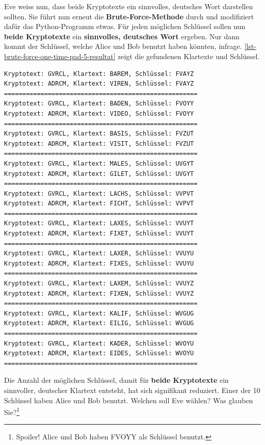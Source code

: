 Eve weiss nun, dass beide Kryptotexte ein sinnvolles, deutsches Wort darstellen sollten. Sie führt nun erneut die \textbf{Brute-Force-Methode} durch und modifiziert dafür das Python-Programm etwas. Für jeden möglichen Schlüssel sollen nun \textbf{beide Kryptotexte} ein \textbf{sinnvolles, deutsches Wort} ergeben. Nur dann kommt der Schlüssel, welche Alice und Bob benutzt haben könnten, infrage. \autoref{lst-brute-force-one-time-pad-5-resultat} zeigt die gefundenen Klartexte und Schlüssel.

\begin{lstlisting}[language=output, label={lst-brute-force-one-time-pad-5-resultat}, caption={Es wurden \num{10} mögliche sinnvolle Klartexte für die beiden Kryptotexte gefunden.}]
Kryptotext: GVRCL, Klartext: BAREM, Schlüssel: FVAYZ
Kryptotext: ADRCM, Klartext: VIREN, Schlüssel: FVAYZ
=====================================================
Kryptotext: GVRCL, Klartext: BADEN, Schlüssel: FVOYY
Kryptotext: ADRCM, Klartext: VIDEO, Schlüssel: FVOYY
=====================================================
Kryptotext: GVRCL, Klartext: BASIS, Schlüssel: FVZUT
Kryptotext: ADRCM, Klartext: VISIT, Schlüssel: FVZUT
=====================================================
Kryptotext: GVRCL, Klartext: MALES, Schlüssel: UVGYT
Kryptotext: ADRCM, Klartext: GILET, Schlüssel: UVGYT
=====================================================
Kryptotext: GVRCL, Klartext: LACHS, Schlüssel: VVPVT
Kryptotext: ADRCM, Klartext: FICHT, Schlüssel: VVPVT
=====================================================
Kryptotext: GVRCL, Klartext: LAXES, Schlüssel: VVUYT
Kryptotext: ADRCM, Klartext: FIXET, Schlüssel: VVUYT
=====================================================
Kryptotext: GVRCL, Klartext: LAXER, Schlüssel: VVUYU
Kryptotext: ADRCM, Klartext: FIXES, Schlüssel: VVUYU
=====================================================
Kryptotext: GVRCL, Klartext: LAXEM, Schlüssel: VVUYZ
Kryptotext: ADRCM, Klartext: FIXEN, Schlüssel: VVUYZ
=====================================================
Kryptotext: GVRCL, Klartext: KALIF, Schlüssel: WVGUG
Kryptotext: ADRCM, Klartext: EILIG, Schlüssel: WVGUG
=====================================================
Kryptotext: GVRCL, Klartext: KADER, Schlüssel: WVOYU
Kryptotext: ADRCM, Klartext: EIDES, Schlüssel: WVOYU
=====================================================
\end{lstlisting}

Die Anzahl der möglichen Schlüssel, damit für \textbf{beide Kryptotexte} ein sinnvoller, deutscher Klartext entsteht, hat sich signifikant reduziert. Einer der \num{10} Schlüssel haben Alice und Bob benutzt. Welchen soll Eve wählen? Was glauben Sie?\footnote{Spoiler! Alice und Bob haben FVOYY als Schlüssel benutzt.}

